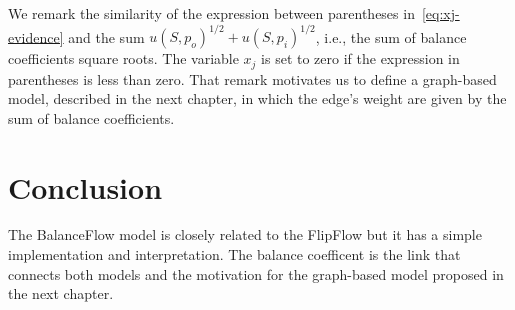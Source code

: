 We remark the similarity of the expression between parentheses in~\cref{eq:xj-evidence} and the sum $u(S,p_o)^{1/2} + u(S,p_i)^{1/2}$, i.e., the sum of balance coefficients square roots. The variable $x_j$ is set to zero if the expression in parentheses is less than zero. That remark motivates us to define a graph-based model, described in the next chapter, in which the edge's weight are given by the sum of balance coefficients.


\section{Conclusion}
The BalanceFlow model is closely related to the FlipFlow but it has a simple implementation and interpretation. The balance coefficent is the link that connects both models and the motivation for the graph-based model proposed in the next chapter.




